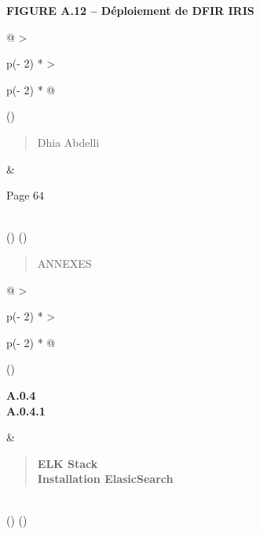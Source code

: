 \documentclass[
]{article}
\begin{document}
\textbf{FIGURE A.12 -- Déploiement de DFIR IRIS}

\begin{longtable}[]{@{}
  >{\raggedright\arraybackslash}p{(\columnwidth - 2\tabcolsep) * }
  >{\raggedright\arraybackslash}p{(\columnwidth - 2\tabcolsep) * }@{}}
\toprule()
\begin{minipage}[b]{\linewidth}\raggedright
\begin{quote}
Dhia Abdelli
\end{quote}
\end{minipage} & \begin{minipage}[b]{\linewidth}\raggedright
Page 64
\end{minipage} \\
\midrule()
\endhead
\bottomrule()
\end{longtable}

\begin{quote}
ANNEXES
\end{quote}

\begin{longtable}[]{@{}
  >{\raggedright\arraybackslash}p{(\columnwidth - 2\tabcolsep) * }
  >{\raggedright\arraybackslash}p{(\columnwidth - 2\tabcolsep) * }@{}}
\toprule()
\begin{minipage}[b]{\linewidth}\raggedright
\textbf{A.0.4}\\
\textbf{A.0.4.1}\strut
\end{minipage} & \begin{minipage}[b]{\linewidth}\raggedright
\begin{quote}
\textbf{ELK Stack}\\
\textbf{Installation ElasicSearch}
\end{quote}\strut
\end{minipage} \\
\midrule()
\endhead
\bottomrule()
\end{longtable}
\end{document}
